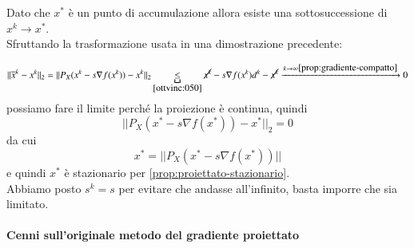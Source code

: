 \begin{thproof}
Dato che $x^{*}$ è un punto di accumulazione allora esiste una
sottosuccessione di $x^k \rightarrow x^{*}$.\\
Sfruttando la trasformazione usata in una dimostrazione precedente:

$$ || \overline{x}^k - x^k ||_2 = 
|| P_X (x^k - s \nabla f(x^k)) - x^k ||_2 \underbracket{\leq}_{\ref{ottvinc:050}}
\cancel{x^k} - s \nabla f(x^k) d^k - \cancel{x^k} 
\xrightarrow{k \to \infty \ref{prop:gradiente-compatto}} 0 $$ 
possiamo fare il limite perché la proiezione è continua, quindi
$$ || P_X (x^{*} - s \nabla f(x^{*})) - x^{*} ||_2 = 0 $$ 
da cui 
$$ x^{*} = || P_X (x^{*} - s \nabla f(x^{*})) || $$
e quindi $x^{*}$ è stazionario per \ref{prop:proiettato-stazionario}.\\

Abbiamo posto $s^k=s$ per evitare che andasse all'infinito, basta
imporre che sia limitato.


\end{thproof}

\paragraph{Cenni sull'originale metodo del gradiente proiettato}

\begin{center}
\end{center}


